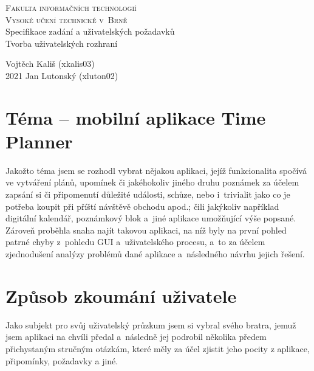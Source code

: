 \documentclass[a4paper, 11pt, twocolumn]{article}
\begin{document}
	\begin{titlepage}
		\begin{center}
			{\Huge\textsc{Fakulta informačních technologií \\ \vspace*{0.2cm} Vysoké učení technické v~Brně}}\\
			\huge {Specifikace zadání a uživatelských požadavků} \\
			\Large {Tvorba uživatelských rozhraní} \\
		\end{center}

		\Large{\hfill Vojtěch Kališ (xkalis03)} \\
		\Large{2021 \hfill Jan Lutonský (xluton02)}
	\end{titlepage}
	

	\section*{\large{Téma -- mobilní aplikace Time Planner}}
	\vspace*{-0.2cm}
	Jakožto téma jsem se rozhodl vybrat nějakou aplikaci, jejíž funkcionalita spočívá ve vytváření plánů, upomínek či jakéhokoliv jiného druhu poznámek za
	účelem zapsání si či připomenutí důležité události, schůze, nebo i~trivialit jako co je potřeba koupit při příští návštěvě obchodu apod.; čili jakýkoliv 
	například digitální kalendář, poznámkový blok a~jiné aplikace umožňující výše popsané. Zároveň proběhla snaha najít takovou aplikaci, na níž byly na
	první pohled patrné chyby z~pohledu GUI a~uživatelského procesu, a~to za účelem zjednodušení analýzy problémů dané aplikace a~následného návrhu
	jejich řešení.
	
	\section*{\large{Způsob zkoumání uživatele}}
	\vspace*{-0.2cm}
	Jako subjekt pro svůj uživatelský průzkum jsem si vybral svého bratra, jemuž jsem aplikaci na chvíli předal a~následně jej podrobil několika předem 
	přichystaným stručným otázkám, které měly za účel zjistit jeho pocity z aplikace, připomínky, požadavky a jiné.
\end{document}
